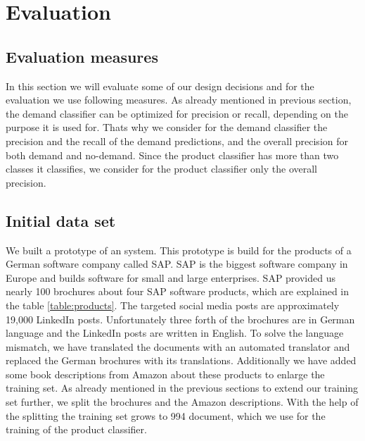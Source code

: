 
\section{Evaluation}
\label{sec:evaluation}

\subsection{Evaluation measures} %
\label{sub:evaluation_measures}
In this section we will evaluate some of our design decisions and for the evaluation we use following measures.
As already mentioned in previous section, the demand classifier can be optimized for precision or recall, depending on the purpose it is used for.
Thats why we consider for the demand classifier the precision and the recall of the demand predictions, and the overall precision for both demand and no-demand.
Since the product classifier has more than two classes it classifies, we consider for the product classifier only the overall precision.


\subsection{Initial data set} %
\label{sub:initial_data_set}
We built a prototype of an \nto system.
This prototype is build for the products of a German software company called SAP.
SAP is the biggest software company in Europe and builds software for small and large enterprises.
SAP provided us nearly 100 brochures about four SAP software products, which are explained in the table \ref{table:products}.
The targeted social media posts are approximately 19,000 LinkedIn posts.
Unfortunately three forth of the brochures are in German language and the LinkedIn posts are written in English.
To solve the language mismatch, we have translated the documents with an automated translator and replaced the German brochures with its translations.
Additionally we have added some book descriptions from Amazon about these products to enlarge the training set.
As already mentioned in the previous sections to extend our training set further, we split the brochures and the Amazon descriptions.
With the help of the splitting the training set grows to 994 document, which we use for the training of the product classifier.

